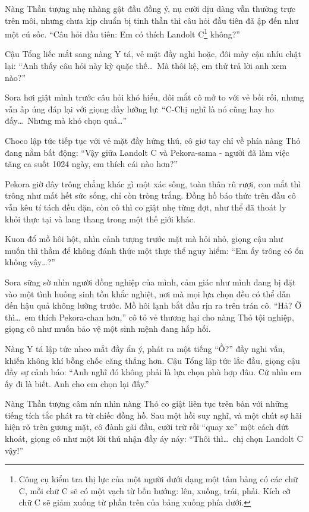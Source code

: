 \documentclass[../main.tex]{subfiles}
\begin{document}
Nàng Thần tượng nhẹ nhàng gật đầu đồng ý, nụ cười dịu dàng vẫn thường trực trên môi, nhưng chưa kịp chuẩn bị tinh thần thì câu hỏi đầu tiên đã ập đến như một cú sốc. ``Câu hỏi đầu tiên: Em có thích Landolt C\footnote{Công cụ kiểm tra thị lực của một người dưới dạng một tấm bảng có các chữ C, mỗi chữ C sẽ có một vạch từ bốn hướng: lên, xuống, trái, phải. Kích cỡ chữ C sẽ giảm xuống từ phần trên của bảng xuống phía dưới.} không?''


Cậu Tổng liếc mắt sang nàng Y tá, vẻ mặt đầy nghi hoặc, đôi mày cậu nhíu chặt lại: ``Anh thấy câu hỏi này kỳ quặc thế\dots\ Mà thôi kệ, em thử trả lời anh xem nào?''

Sora hơi giật mình trước câu hỏi khó hiểu, đôi mắt cô mở to với vẻ bối rối, nhưng vẫn ấp úng đáp lại với giọng đầy lưỡng lự: ``C-Chị nghĩ là nó cũng hay ho đấy\dots\ Nhưng mà khó chọn quá\dots''

Choco lập tức tiếp tục với vẻ mặt đầy hứng thú, cô giơ tay chỉ về phía nàng Thỏ đang nằm bất động: ``Vậy giữa Landolt C và Pekora-sama - người đã làm việc tăng ca suốt 1024 ngày, em thích cái nào hơn?''

Pekora giờ đây trông chẳng khác gì một xác sống, toàn thân rũ rượi, con mắt thì trông như mất hết sức sống, chỉ còn tròng trắng. Đồng hồ báo thức trên đầu cô vẫn kêu tí tách đều đặn, còn cô thì co giật nhẹ từng đợt, như thể đã thoát ly khỏi thực tại và lang thang trong một thế giới khác.


Kuon đổ mồ hôi hột, nhìn cảnh tượng trước mặt mà hỏi nhỏ, giọng cậu như muốn thì thầm để không đánh thức một thực thể nguy hiểm: ``Em ấy trông có ổn không vậy\dots?''

Sora sững sờ nhìn người đồng nghiệp của mình, cảm giác như mình đang bị đặt vào một tình huống sinh tồn khắc nghiệt, nơi mà mọi lựa chọn đều có thể dẫn đến hậu quả không lường trước. Mồ hôi lạnh bắt đầu rịn ra trên trán cô. ``Hả? Ờ thì\dots\ em thích Pekora-chan hơn,'' cô tỏ vẻ thương hại cho nàng Thỏ tội nghiệp, giọng cô như muốn bảo vệ một sinh mệnh đang hấp hối.

Nàng Y tá lập tức nheo mắt đầy ẩn ý, phát ra một tiếng ``Ồ?'' đầy nghi vấn, khiến không khí bỗng chốc căng thẳng hơn. Cậu Tổng lập tức lắc đầu, giọng cậu đầy sự cảnh báo: ``Anh nghĩ đó không phải là lựa chọn phù hợp đâu. Cứ nhìn em ấy đi là biết. Anh cho em chọn lại đấy.''

Nàng Thần tượng câm nín nhìn nàng Thỏ co giật liên tục trên bàn với những tiếng tích tắc phát ra từ chiếc đồng hồ. Sau một hồi suy nghĩ, và một chút sợ hãi hiện rõ trên gương mặt, cô đành gãi đầu, cười trừ rồi ``quay xe'' một cách dứt khoát, giọng cô như một lời thú nhận đầy áy náy: ``Thôi thì\dots\ chị chọn Landolt C vậy!''
\end{document}
